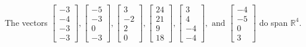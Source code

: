 \begin{exercise}
\begin{exerciseStatement}
  \end{exerciseStatement}
  \begin{exerciseAnswer}
   The vectors \(\left[\begin{array}{r}
-3 \\
-4 \\
-3 \\
-3
\end{array}\right] , \left[\begin{array}{r}
-5 \\
-3 \\
0 \\
-3
\end{array}\right] , \left[\begin{array}{r}
3 \\
-2 \\
2 \\
0
\end{array}\right] , \left[\begin{array}{r}
24 \\
21 \\
9 \\
18
\end{array}\right] , \left[\begin{array}{r}
3 \\
4 \\
-4 \\
-4
\end{array}\right] , \text{ and } \left[\begin{array}{r}
-4 \\
-5 \\
0 \\
3
\end{array}\right]\) 
  	 do  
	span \(\mathbb{R}^4\).
  


  \end{exerciseAnswer}
\end{exercise}